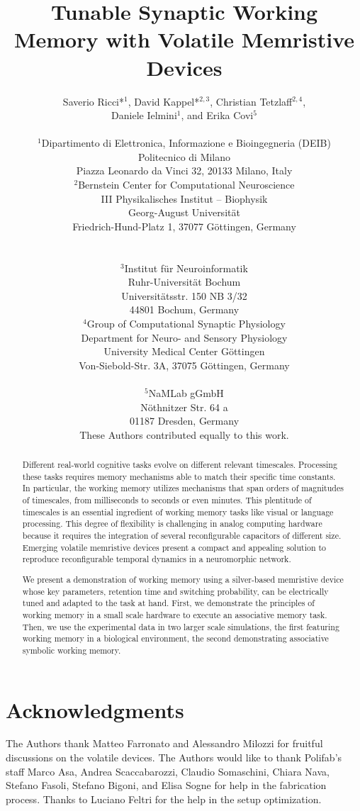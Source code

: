 \documentclass{article}
\title{Tunable Synaptic Working Memory with Volatile Memristive Devices}
\author{Saverio Ricci*$^{1}$, David Kappel*$^{2,3}$, Christian Tetzlaff$^{2,4}$,\\ Daniele Ielmini$^{1}$, and Erika Covi$^{5}$\\[4mm]
\begin{minipage}[t]{0.48\linewidth}
\centering
\small $^{1}$\;Dipartimento di Elettronica, Informazione e Bioingegneria (DEIB)\\
\small Politecnico di Milano\\
\small Piazza Leonardo da Vinci 32, 20133 Milano, Italy
\end{minipage}
\begin{minipage}[t]{0.48\linewidth}
\centering
\small $^{2}$\;Bernstein Center for Computational Neuroscience\\
\small III Physikalisches Institut – Biophysik\\
\small Georg-August Universit\"at\\
\small Friedrich-Hund-Platz 1, 37077 G\"ottingen, Germany
\end{minipage}\vspace{6mm}\\
\begin{minipage}[t]{0.48\linewidth}
\centering
\small $^{3}$\;Institut für Neuroinformatik \\
\small Ruhr-Universit\"at Bochum \\
\small Universit\"atsstr. 150 NB 3/32\\
44801 Bochum, Germany
\end{minipage}
\begin{minipage}[t]{0.48\linewidth}
\centering
\small $^{4}$\;Group of Computational Synaptic Physiology\\
\small Department for Neuro- and Sensory Physiology\\
\small University Medical Center G\"ottingen\\
\small Von-Siebold-Str. 3A, 37075 G\"ottingen, Germany
\end{minipage}\vspace{6mm}\\
\small $^{5}$\;NaMLab gGmbH\\
\small N\"othnitzer Str. 64 a \\
\small 01187 Dresden, Germany
\vspace{6mm}\\
\small* These Authors contributed equally to this work.}
\date{}
\begin{document}
\maketitle

\begin{abstract} %
Different real-world cognitive tasks evolve on different relevant timescales. Processing these tasks requires memory mechanisms able to match their specific time constants. In particular, the working memory utilizes mechanisms that span orders of magnitudes of timescales, from milliseconds to seconds or even minutes. This plentitude of timescales is an essential ingredient of working memory tasks like visual or language processing.  
This degree of flexibility is challenging in analog computing hardware because it requires the integration of several reconfigurable capacitors of different size. Emerging volatile memristive devices present a compact and appealing solution to reproduce reconfigurable temporal dynamics in a neuromorphic network.

We present a demonstration of working memory using a silver-based memristive device whose key parameters, retention time and switching probability, can be electrically tuned and adapted to the task at hand. First, we demonstrate the principles of working memory in a small scale hardware to execute an associative memory task. Then, we use the experimental data in two larger scale simulations, the first featuring working memory in a biological environment, the second demonstrating associative symbolic working memory.

\end{abstract}

\newpage
\begingroup
\let\clearpage\relax





\endgroup




\section*{Acknowledgments}
The Authors thank Matteo Farronato and Alessandro Milozzi for fruitful discussions on the volatile devices. The Authors would like to thank Polifab's staff Marco Asa, Andrea Scaccabarozzi, Claudio Somaschini, Chiara Nava, Stefano Fasoli, Stefano Bigoni, and Elisa Sogne for help in the fabrication process. Thanks to Luciano Feltri for the help in the setup optimization.
\end{document}
